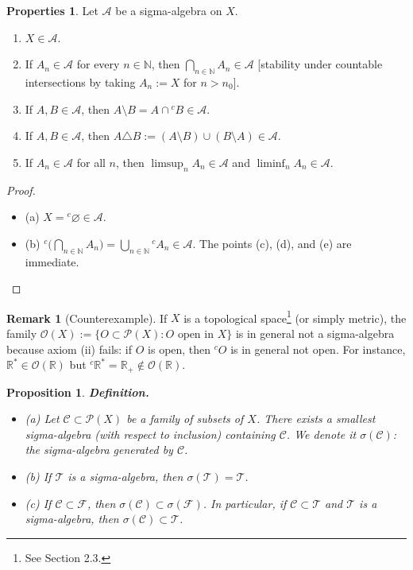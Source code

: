 \documentclass[11pt]{article}
\newtheorem{proposition}{Proposition}[section]
\theoremstyle{definition}
\newtheorem{remark}{Remark}[section]
\newtheorem{properties}{Properties}[section]
\begin{document}
\begin{properties}
Let $\mathcal A$ be a sigma-algebra on $X$.
\begin{enumerate}[label=(\alph*),leftmargin=2em]
\item $X\in\mathcal A$.
\item If $A_n\in\mathcal A$ for every $n\in\mathbb N$, then $\displaystyle \bigcap_{n\in\mathbb N} A_n\in\mathcal A$ \hfill[stability under countable intersections by taking $A_n:=X$ for $n>n_0$].
\item If $A,B\in\mathcal A$, then $A\setminus B=A\cap{}^{c}\!B\in\mathcal A$.
\item If $A,B\in\mathcal A$, then $A\triangle B:=(A\setminus B)\cup(B\setminus A)\in\mathcal A$.
\item If $A_n\in\mathcal A$ for all $n$, then $\limsup_{n} A_n\in\mathcal A$ and $\liminf_{n} A_n\in\mathcal A$.
\end{enumerate}
	
\end{properties}

\begin{proof}
\begin{itemize}
\item (a) $X={}^c\!\varnothing\in\mathcal A$. \quad
\item (b) ${}^{c}\!\bigl(\bigcap_{n\in\mathbb N}A_n\bigr)=\bigcup_{n\in\mathbb N} {}^{c}\!A_n\in\mathcal A$.
The points (c), (d), and (e) are immediate.
\end{itemize}
\end{proof}

\medskip\noindent
\begin{remark} [Counterexample]
If $X$ is a topological space\footnote{See Section 2.3.} (or simply metric), the family $\mathcal O(X):=\{O\subset\mathcal P(X): O \text{ open in }X\}$ is in general not a sigma-algebra because axiom (ii) fails: if $O$ is open, then ${}^{c}\!O$ is in general not open. For instance, $\mathbb R^\ast\in\mathcal O(\mathbb R)$ but ${}^{c}\!\mathbb R^\ast=\mathbb R_+\notin\mathcal O(\mathbb R)$.
\end{remark}

\begin{proposition}\label{prop:gen}
\textbf{Definition.}\quad
\begin{itemize}
\item (a) Let $\mathscr C\subset\mathcal P(X)$ be a family of subsets of $X$. There exists a smallest sigma-algebra (with respect to inclusion) containing $\mathscr C$. We denote it $\sigma(\mathscr C)$: the sigma-algebra generated by $\mathscr C$.

\item (b) If $\mathcal T$ is a sigma-algebra, then $\sigma(\mathcal T)=\mathcal T$.

\item (c) If $\mathscr C\subset\mathscr F$, then $\sigma(\mathscr C)\subset \sigma(\mathscr F)$. In particular, if $\mathscr C\subset \mathcal T$ and $\mathcal T$ is a sigma-algebra, then $\sigma(\mathscr C)\subset\mathcal T$.
\end{itemize}
\end{proposition}
\end{document}
